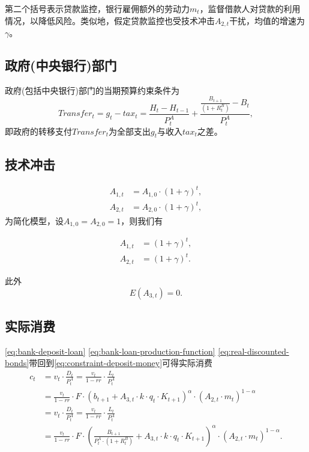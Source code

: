 第二个括号表示贷款监控，银行雇佣额外的劳动力$m_t$，监督借款人对贷款的利用情况，以降低风险。类似地，假定贷款监控也受技术冲击$A_{2,t}$干扰，均值的增速为$\gamma$。

\subsection{政府(中央银行)部门}
政府(包括中央银行)部门的当期预算约束条件为
\begin{equation}
\label{eq:gov-bud-cons-cb}
Transfer_t = g_t - tax_{t} = \frac{H_t-H_{t-1}}{P_t^A} + \frac{\frac{B_{t+1}}{\left(1+R_t^B\right)}-B_t}{P_t^A},
\end{equation}
即政府的转移支付$Transfer_t$为全部支出$g_t$与收入$tax_{t}$之差。

\subsection{技术冲击}
\begin{align*}
A_{1,t} &= A_{1,0} \cdot \left(1+\gamma\right)^t, \\
A_{2,t} &= A_{2,0} \cdot \left(1+\gamma\right)^t,
\end{align*}
为简化模型，设$A_{1,0}=A_{2,0}=1$，则我们有

\begin{align}
\label{eq:tech-shcoks-a1t}
A_{1,t} &= \left(1+\gamma\right)^t, \\
\label{eq:tech-shcoks-a2t}
A_{2,t} &= \left(1+\gamma\right)^t.
\end{align}

此外
\begin{equation}
\label{eq:tech-shcoks-a3t}
E(A_{3,t}) = 0.
\end{equation}

\subsection{实际消费}
\eqref{eq:bank-deposit-loan} \eqref{eq:bank-loan-production-function} \eqref{eq:real-discounted-bonds}带回到\eqref{eq:constraint-deposit-money}可得实际消费
\begin{equation}
\label{eq:hh-real-consumption}
\begin{split}
c_t&= v_t \cdot \frac{D_t}{P_t^A} =\frac{v_t}{1-rr} \cdot \frac{L_t}{P_t^A} \\
&=\frac{v_t}{1-rr} \cdot F \cdot
\left(
b_{t+1} + A_{3,t} \cdot k \cdot q_t \cdot K_{t+1}
\right)^{\alpha} \cdot
\left(
A_{2,t} \cdot m_t
\right)^{1-\alpha} \\
&=v_t \cdot \frac{D_t}{P_t^A} =\frac{v_t}{1-rr} \cdot \frac{L_t}{P_t^A} \\
&=\frac{v_t}{1-rr} \cdot F \cdot
\left(
\frac{B_{t+1}}{P_t^A \cdot \left(1+R_t^B\right)} + A_{3,t} \cdot k \cdot q_t \cdot K_{t+1}
\right)^{\alpha} \cdot
\left(
A_{2,t} \cdot m_t
\right)^{1-\alpha}.
\end{split}
\end{equation}


